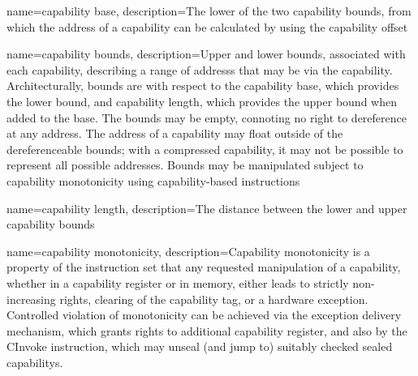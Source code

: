 {
  name=capability base,
  description={The lower of the two \gls{capability bounds}, from which
    the \gls{address} of a \gls{capability} can be calculated by using
    the \gls{capability offset}}
}

{
  name=capability bounds,
  description={Upper and lower bounds, associated with each
    \gls{capability}, describing a range of \glspl{address} that may
    be  via the capability.
    Architecturally, bounds are with respect to the \gls{capability base},
    which provides the lower bound, and \gls{capability length}, which
    provides the upper bound when added to the base.
    The bounds may be empty, connoting no right to dereference at any
    address.
    The address of a capability may float outside of the
    dereferenceable bounds; with a \gls{compressed capability}, it may not
    be possible to represent all possible  addresses.
    Bounds may be manipulated subject to \gls{capability monotonicity}
    using \gls{capability-based instructions}}
}

{
  name=capability length,
  description={The distance between the lower and upper \gls{capability
    bounds}}
}

{
  name=capability monotonicity,
  description={Capability monotonicity is a property of the instruction set
    that any requested manipulation of a \gls{capability}, whether in a
    \gls{capability register} or in memory, either leads to strictly
    non-increasing rights, clearing of the \gls{capability tag}, or a
    hardware exception.
    Controlled violation of monotonicity can be achieved via the exception
    delivery mechanism, which grants rights to additional capability
    register, and also by the \gls{CInvoke} instruction, which may
    unseal (and jump to) suitably checked \glspl{sealed
    capability}.
    }
}

